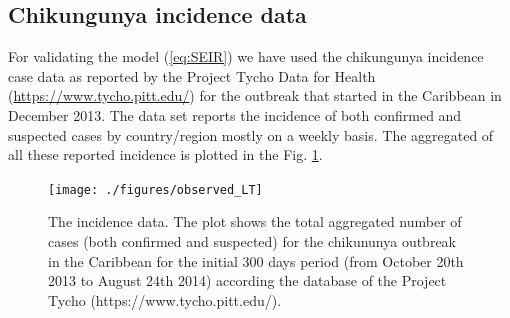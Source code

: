 \documentclass[10pt,a4paper]{article}
\begin{document}
\subsection*{Chikungunya incidence data}
For validating the model (\ref{eq:SEIR}) we have used the chikungunya incidence case data as reported by the Project Tycho Data for Health (\url{https://www.tycho.pitt.edu/}) for the outbreak that started in the Caribbean in December 2013. The data set reports the incidence of both confirmed and suspected cases by country/region mostly on a weekly basis. The aggregated of all these reported incidence is plotted in the Fig. \ref{fig:tycho-incidence-a}. 
%
\begin{figure}[ht]
\centering
\texttt{[image: ./figures/observed\_LT]}
\caption{\small The incidence data. The plot shows the total aggregated number of cases (both confirmed and suspected) for the chikununya outbreak in the Caribbean for the initial 300 days period (from October 20th 2013 to August 24th 2014) according the database of the Project Tycho (https://www.tycho.pitt.edu/).}
\label{fig:tycho-incidence-a}
\end{figure}
%
\end{document}
